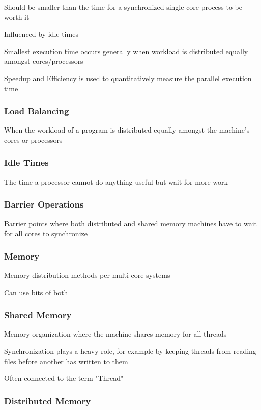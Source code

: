 \documentclass{article}
\begin{document}
Should be smaller than the time for a synchronized single core process to be worth it

Influenced by idle times

Smallest execution time occurs generally when workload is distributed equally amongst cores/processors

Speedup and Efficiency is used to quantitatively measure the parallel execution time

\subsubsection{Load Balancing}

When the workload of a program is distributed equally amongst the machine's cores or processors

\subsubsection{Idle Times}

The time a processor cannot do anything useful but wait for more work

\subsubsection{Barrier Operations}

Barrier points where both distributed and shared memory machines have to wait for all cores to synchronize

\subsubsection{Memory}

Memory distribution methods per multi-core systems

Can use bits of both

\subsubsection{Shared Memory}

Memory organization where the machine shares memory for all threads

Synchronization plays a heavy role, for example by keeping threads from reading files before another has written to them

Often connected to the term "Thread"

\subsubsection{Distributed Memory}
\end{document}
